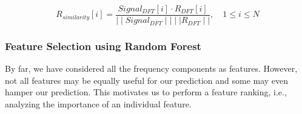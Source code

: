 \documentclass[12pt,a4paper]{article}
\makeatletter
\newcommand*\bigcdot{\mathpalette\bigcdot@{.5}}
\newcommand*\bigcdot@[2]{\mathbin{\vcenter{\hbox{\scalebox{#2}{$\math#1\bullet$}}}}}
\makeatother
\begin{document}
    \begin{equation}
        R_{similarity}[i]=\frac{Signal_{DFT}[i] \cdot R_{DFT}[i] }{{\mid\mid Signal_{DFT} \mid\mid \text{} \mid\mid R_{DFT}\mid\mid}}, \quad 1 \leq i \leq N
    \end{equation}

    
    
    
    
    

\subsubsection{Feature Selection using Random Forest}

By far, we have considered all the frequency components as features. However, not all features may be equally useful for our prediction and some may even hamper our prediction. This motivates us to perform a feature ranking, i.e., analyzing the importance of an individual feature.
\end{document}
